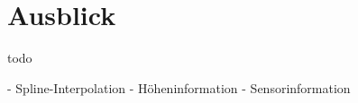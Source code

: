 \chapter{Ausblick}
\label{kap7}

todo

- Spline-Interpolation
- Höheninformation
- Sensorinformation